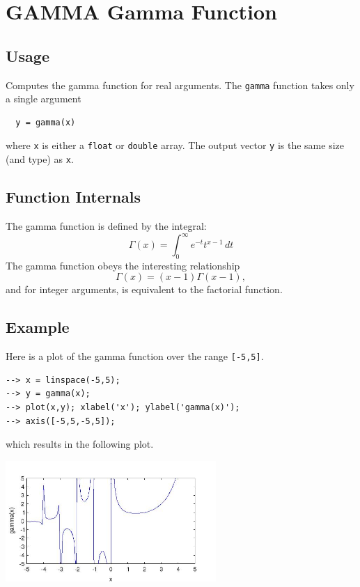 \section{GAMMA Gamma Function}

\subsection{Usage}

Computes the gamma function for real arguments.  The \verb|gamma|
function takes only a single argument
\begin{verbatim}
  y = gamma(x)
\end{verbatim}
where \verb|x| is either a \verb|float| or \verb|double| array.  The output
vector \verb|y| is the same size (and type) as \verb|x|.
\subsection{Function Internals}

The gamma function is defined by the integral:
\[
  \Gamma(x) = \int_{0}^{\infty} e^{-t} t^{x-1} \, dt
\]
The gamma function obeys the interesting relationship
\[
  \Gamma(x) = (x-1)\Gamma(x-1),
\]
and for integer arguments, is equivalent to the factorial function.
\subsection{Example}

Here is a plot of the gamma function over the range \verb|[-5,5]|.
\begin{verbatim}
--> x = linspace(-5,5);
--> y = gamma(x);
--> plot(x,y); xlabel('x'); ylabel('gamma(x)');
--> axis([-5,5,-5,5]);
\end{verbatim}
which results in the following plot.


\centerline{\includegraphics[width=8cm]{gamma1}}

